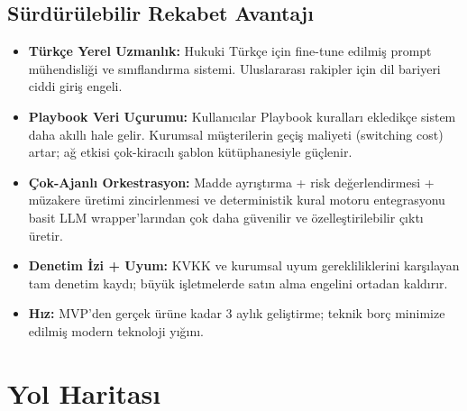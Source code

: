 \documentclass[12pt,a4paper]{article}
\begin{document}
\subsection{Sürdürülebilir Rekabet Avantajı}

\begin{itemize}[itemsep=5pt]
  \item \textbf{Türkçe Yerel Uzmanlık:} Hukuki Türkçe için fine-tune edilmiş prompt mühendisliği
  ve sınıflandırma sistemi. Uluslararası rakipler için dil bariyeri ciddi giriş engeli.

  \item \textbf{Playbook Veri Uçurumu:} Kullanıcılar Playbook kuralları ekledikçe sistem daha
  akıllı hale gelir. Kurumsal müşterilerin geçiş maliyeti (switching cost) artar; ağ etkisi
  çok-kiracılı şablon kütüphanesiyle güçlenir.

  \item \textbf{Çok-Ajanlı Orkestrasyon:} Madde ayrıştırma + risk değerlendirmesi + müzakere
  üretimi zincirlenmesi ve deterministik kural motoru entegrasyonu basit LLM wrapper'larından
  çok daha güvenilir ve özelleştirilebilir çıktı üretir.

  \item \textbf{Denetim İzi + Uyum:} KVKK ve kurumsal uyum gerekliliklerini karşılayan tam
  denetim kaydı; büyük işletmelerde satın alma engelini ortadan kaldırır.

  \item \textbf{Hız:} MVP'den gerçek ürüne kadar 3 aylık geliştirme; teknik borç minimize
  edilmiş modern teknoloji yığını.
\end{itemize}

\section{Yol Haritası}
\end{document}
